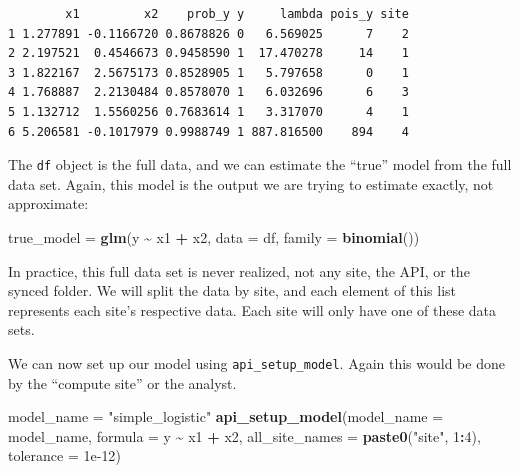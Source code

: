 \documentclass[]{elsarticle} %
\newenvironment{Shaded}{\begin{snugshade}}{\end{snugshade}}
\newcommand{\DataTypeTok}[1]{\textcolor[rgb]{0.13,0.29,0.53}{#1}}
\newcommand{\DecValTok}[1]{\textcolor[rgb]{0.00,0.00,0.81}{#1}}
\newcommand{\FloatTok}[1]{\textcolor[rgb]{0.00,0.00,0.81}{#1}}
\newcommand{\KeywordTok}[1]{\textcolor[rgb]{0.13,0.29,0.53}{\textbf{#1}}}
\newcommand{\NormalTok}[1]{#1}
\newcommand{\OperatorTok}[1]{\textcolor[rgb]{0.81,0.36,0.00}{\textbf{#1}}}
\newcommand{\StringTok}[1]{\textcolor[rgb]{0.31,0.60,0.02}{#1}}
\begin{document}
\begin{verbatim}
        x1         x2    prob_y y     lambda pois_y site
1 1.277891 -0.1166720 0.8678826 0   6.569025      7    2
2 2.197521  0.4546673 0.9458590 1  17.470278     14    1
3 1.822167  2.5675173 0.8528905 1   5.797658      0    1
4 1.768887  2.2130484 0.8578070 1   6.032696      6    3
5 1.132712  1.5560256 0.7683614 1   3.317070      4    1
6 5.206581 -0.1017979 0.9988749 1 887.816500    894    4
\end{verbatim}

The \texttt{df} object is the full data, and we can estimate the ``true'' model from the full data set. Again, this model is the output we are trying to estimate exactly, not approximate:

\begin{Shaded}
\begin{Highlighting}[]
\NormalTok{true\_model =}\StringTok{ }\KeywordTok{glm}\NormalTok{(y }\OperatorTok{\textasciitilde{}}\StringTok{ }\NormalTok{x1 }\OperatorTok{+}\StringTok{ }\NormalTok{x2, }\DataTypeTok{data =}\NormalTok{ df, }\DataTypeTok{family =} \KeywordTok{binomial}\NormalTok{())}
\end{Highlighting}
\end{Shaded}

In practice, this full data set is never realized, not any site, the API, or the synced folder. We will split the data by site, and each element of this list represents each site's respective data. Each site will only have one of these data sets.

\begin{Shaded}
\end{Shaded}

We can now set up our model using \texttt{api\_setup\_model}. Again this would be done by the ``compute site'' or the analyst.

\begin{Shaded}
\begin{Highlighting}[]
\NormalTok{model\_name =}\StringTok{ "simple\_logistic"}
\KeywordTok{api\_setup\_model}\NormalTok{(}\DataTypeTok{model\_name =}\NormalTok{ model\_name, }\DataTypeTok{formula =}\NormalTok{ y }\OperatorTok{\textasciitilde{}}\StringTok{ }\NormalTok{x1 }\OperatorTok{+}\StringTok{ }\NormalTok{x2,}
                \DataTypeTok{all\_site\_names =} \KeywordTok{paste0}\NormalTok{(}\StringTok{"site"}\NormalTok{, }\DecValTok{1}\OperatorTok{:}\DecValTok{4}\NormalTok{), }\DataTypeTok{tolerance =} \FloatTok{1e{-}12}\NormalTok{)}
\end{Highlighting}
\end{Shaded}
\end{document}
